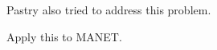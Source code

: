 \documentclass{IEEEtran}
\begin{document}
Pastry also tried to address this problem.


Apply this to MANET.




\end{document}
